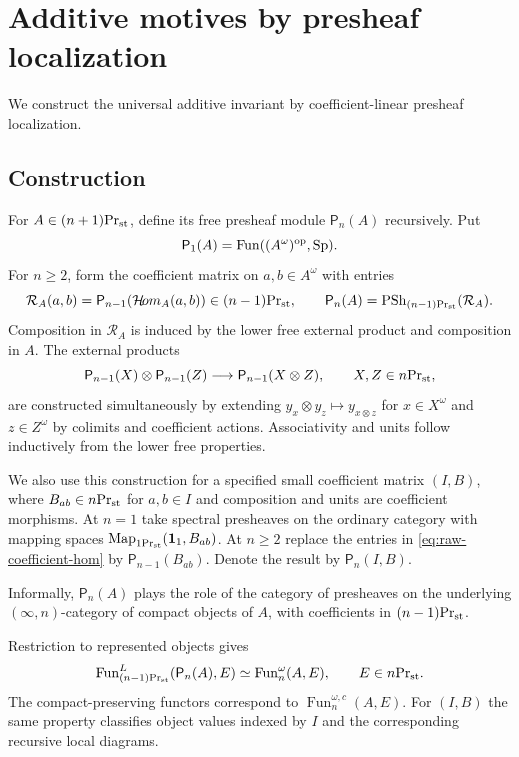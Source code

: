 \section{Additive motives by presheaf localization}\label{sec:presheaf}

We construct the universal additive invariant by coefficient-linear
presheaf localization.

\subsection{Construction}

\begin{definition}\label{def:raw-presheaves}
For $A\in{(n+1)}\mathrm{Pr}_{\mathrm{st}}$, define its free presheaf module $\mathsf P_n(A)$ recursively.
Put
\[
 \mathsf P_1(A)=\operatorname{Fun}((A^\omega)^{\mathrm{op}},\mathrm{Sp}).
\]
For $n\geq2$, form the coefficient matrix on $a,b\in A^\omega$
with entries
\begin{equation}\label{eq:raw-coefficient-hom}
 \mathcal R_A(a,b)=\mathsf P_{n-1}(\mathcal{H}\!om_A(a,b))
       \in{(n-1)}\mathrm{Pr}_{\mathrm{st}},
 \qquad
 \mathsf P_n(A)=\operatorname{PSh}_{{(n-1)}\mathrm{Pr}_{\mathrm{st}}}(\mathcal R_A).
\end{equation}
Composition in $\mathcal R_A$ is induced by the lower free external product
and composition in $A$. The external products
\[
 \mathsf P_{n-1}(X)\otimes\mathsf P_{n-1}(Z)
 \longrightarrow\mathsf P_{n-1}(X\otimes Z),
 \qquad X,Z\in{n}\mathrm{Pr}_{\mathrm{st}},
\]
are constructed simultaneously by extending
$y_x\otimes y_z\mapsto y_{x\otimes z}$
for $x\in X^\omega$ and $z\in Z^\omega$
by colimits and coefficient actions.
Associativity and units follow inductively
from the lower free properties.

We also use this construction for a specified small coefficient
matrix $(I,B)$, where $B_{ab}\in{n}\mathrm{Pr}_{\mathrm{st}}$ for \(a,b\in I\) and composition and units
are coefficient morphisms. At $n=1$ take spectral presheaves on the
ordinary category with mapping spaces
$\operatorname{Map}_{{1}\mathrm{Pr}_{\mathrm{st}}}(\mathbf 1_1,B_{ab})$.
At $n\geq2$ replace the entries in \eqref{eq:raw-coefficient-hom}
by $\mathsf P_{n-1}(B_{ab})$. Denote the result by
$\mathsf P_n(I,B)$.
\end{definition}

Informally, $\mathsf P_n(A)$ plays the role of
the category of presheaves on the underlying
$(\infty,n)$-category of compact objects of $A$,
with coefficients in ${(n-1)}\mathrm{Pr}_{\mathrm{st}}$.


Restriction to represented objects gives
\begin{equation}\label{eq:raw-presheaf-up}
 \operatorname{Fun}^L_{{(n-1)}\mathrm{Pr}_{\mathrm{st}}}(\mathsf P_n(A),E)
 \simeq\operatorname{Fun}_n^\omega(A,E),
 \qquad E\in{n}\mathrm{Pr}_{\mathrm{st}}.
\end{equation}
The compact-preserving functors correspond to
$\operatorname{Fun}_n^{\omega,c}(A,E)$.
For $(I,B)$ the same property classifies object values indexed by
$I$ and the corresponding recursive local diagrams.

